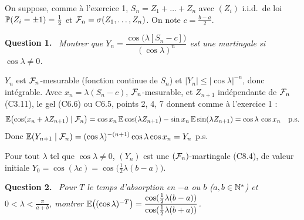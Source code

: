 \documentclass[11pt,a4paper]{article}
\newcommand{\question}[1]{\par\medskip\noindent\textbf{Question #1.}~}
\begin{document}
\begin{exo}

On suppose, comme à l'exercice 1, $S_n=Z_1+\dots+Z_n$ avec $(Z_i)$ i.i.d.\ de loi $\mathbb{P}(Z_i=\pm1)=\frac12$ et $\mathcal{F}_n=\sigma(Z_1,\dots,Z_n)$.
On note $c=\frac{b-a}2$.

\question{1} \emph{Montrer que $Y_n=\dfrac{\cos\bigl(\lambda[S_n-c]\bigr)}{(\cos\lambda)^n}$ est une martingale si $\cos\lambda\neq0$.}

$Y_n$ est $\mathcal{F}_n$-mesurable (fonction continue de $S_n$) et $|Y_n|\le|\cos\lambda|^{-n}$, donc intégrable. Avec $x_n=\lambda(S_n-c)$,
$\mathcal{F}_n$-mesurable, et $Z_{n+1}$ indépendante de $\mathcal{F}_n$ (C3.11), le gel (C6.6) ou C6.5, points 2, 4, 7 donnent comme à l'exercice 1 :
\[\mathbb{E}\bigl(\cos(x_n+\lambda Z_{n+1})\mid\mathcal{F}_n\bigr)=\cos x_n\,\mathbb{E}\cos(\lambda Z_{n+1})-\sin x_n\,\mathbb{E}\sin(\lambda Z_{n+1})=\cos\lambda\,\cos x_n\quad\text{p.s.}\]
Donc $\mathbb{E}(Y_{n+1}\mid\mathcal{F}_n)=(\cos\lambda)^{-(n+1)}\cos\lambda\cos x_n=Y_n$ p.s.
\begin{resultat}
Pour tout $\lambda$ tel que $\cos\lambda\neq0$, $(Y_n)$ est une $(\mathcal{F}_n)$-martingale (C8.4), de valeur initiale $Y_0=\cos(\lambda c)=\cos\bigl(\tfrac12\lambda(b-a)\bigr)$.
\end{resultat}

\question{2} \emph{Pour $T$ le temps d'absorption en $-a$ ou $b$ ($a,b\in\mathbb{N}^*$) et $0<\lambda<\frac\pi{a+b}$, montrer
$\mathbb{E}\bigl((\cos\lambda)^{-T}\bigr)=\dfrac{\cos(\frac12\lambda(b-a))}{\cos(\frac12\lambda(b+a))}$.}


\end{exo}
\end{document}

